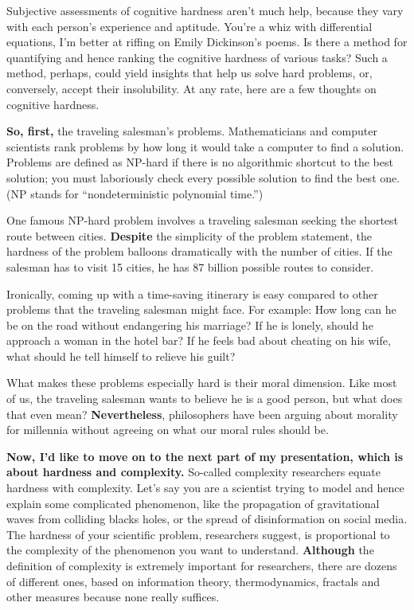 \documentclass[a4paper]{article}
\renewcommand{\emph}{\textbf}
\begin{document}
Subjective assessments of cognitive hardness aren’t much help, because they vary with each person’s experience and aptitude. You’re a whiz with differential equations, I’m better at riffing on Emily Dickinson’s poems. Is there a method for quantifying and hence ranking the cognitive hardness of various tasks? Such a method, perhaps, could yield insights that help us solve hard problems, or, conversely, accept their insolubility. At any rate, here are a few thoughts on cognitive hardness.

\emph{So, first,} the traveling salesman’s problems.
Mathematicians and computer scientists rank problems by how long it would take a computer to find a solution. Problems are defined as NP-hard if there is no algorithmic shortcut to the best solution; you must laboriously check every possible solution to find the best one. (NP stands for ``nondeterministic polynomial time.'')

One famous NP-hard problem involves a traveling salesman seeking the shortest route between cities. \emph{Despite} the simplicity of the problem statement, the hardness of the problem balloons dramatically with the number of cities. If the salesman has to visit 15 cities, he has 87 billion possible routes to consider. 

Ironically, coming up with a time-saving itinerary is easy compared to other problems that the traveling salesman might face. For example: How long can he be on the road without endangering his marriage? If he is lonely, should he approach a woman in the hotel bar? If he feels bad about cheating on his wife, what should he tell himself to relieve his guilt?

What makes these problems especially hard is their moral dimension. Like most of us, the traveling salesman wants to believe he is a good person, but what does that even mean? \emph{Nevertheless}, philosophers have been arguing about morality for millennia without agreeing on what our moral rules should be.

\emph{Now, I’d like to move on to the next part of my presentation, which is about hardness and complexity.}
So-called complexity researchers equate hardness with complexity. Let’s say you are a scientist trying to model and hence explain some complicated phenomenon, like the propagation of gravitational waves from colliding blacks holes, or the spread of disinformation on social media. The hardness of your scientific problem, researchers suggest, is proportional to the complexity of the phenomenon you want to understand. \emph{Although} the definition of complexity is extremely important for researchers, there are dozens of different ones, based on information theory, thermodynamics, fractals and other measures because none really suffices.
\end{document}
